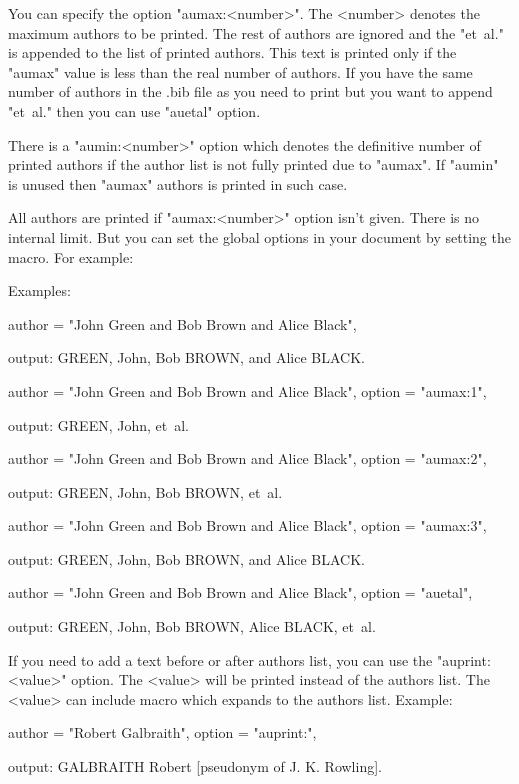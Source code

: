 You can specify the option "aumax:<number>". The <number> denotes the
maximum authors to be printed. The rest of authors are ignored and the
"et~al." is appended to the list of printed authors. This text is
printed only if the "aumax" value is less than the real number of authors. 
If you have the same number of authors in the .bib file as you need to print
but you want to append "et~al." then you can use "auetal" option.

There is a "aumin:<number>" option which denotes the definitive number of 
printed authors if the author list is not fully printed due to "aumax".
If "aumin" is unused then "aumax" authors is printed in such case.

All authors are printed if "aumax:<number>" option isn't given. 
There is no internal limit. But you can set the global options in 
your document by setting the \biboptions macro. For example:

   \def\biboptions {aumax:7 aumin:1}  

Examples:

   author = "John Green and Bob Brown and Alice Black",

output:    GREEN, John, Bob BROWN, and Alice BLACK.

   author = "John Green and Bob Brown and Alice Black",
   option = "aumax:1",

output:    GREEN, John, et~al.

   author = "John Green and Bob Brown and Alice Black",
   option = "aumax:2",

output:    GREEN, John, Bob BROWN, et~al.

   author = "John Green and Bob Brown and Alice Black",
   option = "aumax:3",

output:    GREEN, John, Bob BROWN, and Alice BLACK.

   author = "John Green and Bob Brown and Alice Black",
   option = "auetal",
   
output:    GREEN, John, Bob BROWN, Alice BLACK, et~al.

If you need to add a text before or after authors list, you can use
the "auprint:{<value>}" option. The <value> will be printed instead of the
authors list. The <value> can include \AU macro which expands to the authors
list. Example:

   author = "Robert Galbraith",
   option = "auprint:{\AU{}}",

output:    GALBRAITH Robert [pseudonym of J. K. Rowling].

